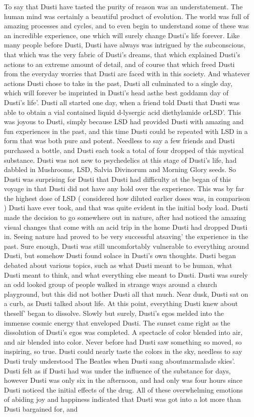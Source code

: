 \documentclass[12pt]{book}
\begin{document}
To say that Dusti have tasted the purity of reason was an understatement. The human mind was certainly a beautiful product of evolution. The world was full of amazing processes and cycles, and to even begin to understand some of these was an incredible experience, one which will surely change Dusti's life forever. Like many people before Dusti, Dusti have always was intrigued by the subconscious, that which was the very fabric of Dusti's dreams, that which explained Dusti's actions to an extreme amount of detail, and of course that which freed Dusti from the everyday worries that Dusti are faced with in this society. And whatever actions Dusti chose to take in the past, Dusti all culminated to a single day, which will forever be imprinted in Dusti's head asthe best goddamn day of Dusti's life'. Dusti all started one day, when a friend told Dusti that Dusti was able to obtain a vial contained liquid d-lysergic acid diethylamide orLSD'. This was joyous to Dusti, simply because LSD had provided Dusti with amazing and fun experiences in the past, and this time Dusti could be repeated with LSD in a form that was both pure and potent. Needless to say a few friends and Dusti purchased a bottle, and Dusti each took a total of four dropped of this mystical substance. Dusti was not new to psychedelics at this stage of Dusti's life, had dabbled in Mushrooms, LSD, Salvia Divinorum and Morning Glory seeds. So Dusti was surprising for Dusti that Dusti had difficulty at the began of this voyage in that Dusti did not have any hold over the experience. This was by far the highest dose of LSD ( considered how diluted earlier doses was, in comparison ) Dusti have ever took, and that was quite evident in the initial body load. Dusti made the decision to go somewhere out in nature, after had noticed the amazing visual changes that come with an acid trip in the home Dusti had dropped Dusti in. Seeing nature had proved to be very successful atsaving' the experience in the past. Sure enough, Dusti was still uncomfortably vulnerable to everything around Dusti, but somehow Dusti found solace in Dusti's own thoughts. Dusti began debated about various topics, such as what Dusti meant to be human, what Dusti meant to think, and what everything else meant to Dusti. Dusti was surely an odd looked group of people walked in strange ways around a church playground, but this did not bother Dusti all that much. Near dusk, Dusti sat on a curb, as Dusti talked about life. At this point, everything Dusti knew about theself' began to dissolve. Slowly but surely, Dusti's egos melded into the immense cosmic energy that enveloped Dusti. The sunset came right as the dissolution of Dusti's egos was completed. A spectacle of color blended into air, and air blended into color. Never before had Dusti saw something so moved, so inspiring, so true. Dusti could nearly taste the colors in the sky, needless to say Dusti truly understood The Beatles when Dusti sang aboutmarmalade skies'. Dusti felt as if Dusti had was under the influence of the substance for days, however Dusti was only six in the afternoon, and had only was four hours since Dusti noticed the initial effects of the drug. All of these overwhelming emotions of abiding joy and happiness indicated that Dusti was got into a lot more than Dusti bargained for, and 
\end{document}
